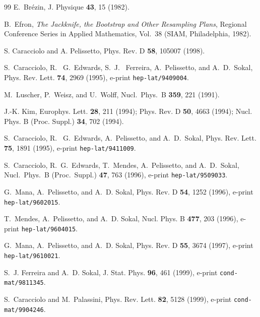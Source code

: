\documentclass[12pt]{article}
\begin{document}
\begin{thebibliography}{99}
E.~Br\'ezin,
\newblock J. Physique {\bf 43}, 15 (1982).

B.~Efron,
{\em The Jackknife, the Bootstrap and Other Resampling Plans},
  Regional Conference Series in Applied Mathematics, Vol.~38 (SIAM,
  Philadelphia, 1982).

S. Caracciolo and A. Pelissetto,
Phys. Rev. D {\bf 58}, 105007 (1998).

{S.~Caracciolo, R.~ G.~Edwards, S.~J.~ Ferreira, A.~Pelissetto, and
  A.~D.~Sokal},
\newblock Phys. Rev. Lett. {\bf 74}, 2969 (1995), 
e-print {\tt hep-lat/9409004}.

M.~Luscher, P.~Weisz, and U.~Wolff,
Nucl.\ Phys.\ B {\bf 359}, 221 (1991).

J.-K. Kim,
Europhys. Lett. {\bf 28}, 211 (1994);
Phys. Rev. D {\bf 50}, 4663 (1994);
Nucl. Phys. B (Proc. Suppl.) {\bf 34}, 702 (1994).

{S.~Caracciolo, R.~ G.~Edwards, A.~Pelissetto, and A.~D.~Sokal},
\newblock Phys. Rev. Lett. {\bf 75}, 1891 (1995), 
e-print {\tt hep-lat/9411009}.

S.~Caracciolo, R.~G.~Edwards, T.~Mendes, A.~Pelissetto, and A.~D.~Sokal,
Nucl.\ Phys.\ B (Proc.\ Suppl.)  {\bf 47}, 763 (1996),
e-print {\tt hep-lat/9509033}.

G.~Mana, A.~Pelissetto, and A.~D. Sokal,
\newblock Phys. Rev. D {\bf 54}, 1252 (1996),
e-print {\tt hep-lat/9602015}.

T.~Mendes, A.~Pelissetto, and A.~D. Sokal,
\newblock Nucl. Phys. B {\bf 477}, 203 (1996),
e-print {\tt hep-lat/9604015}.

G.~Mana, A.~Pelissetto, and A.~D. Sokal,
\newblock Phys. Rev. D {\bf 55}, 3674 (1997),
e-print {\tt hep-lat/9610021}.

S.~J. Ferreira and A.~D. Sokal,
\newblock J. Stat. Phys. {\bf 96}, 461 (1999),
e-print {\tt cond-mat/9811345}.

S.~Caracciolo and M.~Palassini,
\newblock Phys. Rev. Lett. {\bf 82}, 5128 (1999),
e-print {\tt cond-mat/9904246}.


\end{thebibliography}
\end{document}
